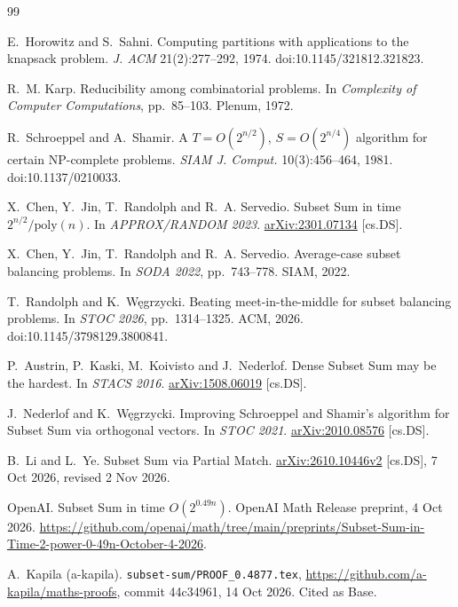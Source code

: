 \documentclass[11pt]{article}
\theoremstyle{plain}
\begin{document}
\begin{thebibliography}{99}

E.~Horowitz and S.~Sahni. Computing partitions with applications to the knapsack problem. \emph{J. ACM} 21(2):277--292, 1974. doi:10.1145/321812.321823.

R.~M. Karp. Reducibility among combinatorial problems. In \emph{Complexity of Computer Computations}, pp.~85--103. Plenum, 1972.

R.~Schroeppel and A.~Shamir. A $T = O(2^{n/2})$, $S = O(2^{n/4})$ algorithm for certain NP-complete problems. \emph{SIAM J. Comput.} 10(3):456--464, 1981. doi:10.1137/0210033.

X.~Chen, Y.~Jin, T.~Randolph and R.~A. Servedio. Subset Sum in time $2^{n/2}/\mathrm{poly}(n)$. In \emph{APPROX/RANDOM 2023}. \href{https://arxiv.org/abs/2301.07134}{arXiv:2301.07134} [cs.DS].

X.~Chen, Y.~Jin, T.~Randolph and R.~A. Servedio. Average-case subset balancing problems. In \emph{SODA 2022}, pp.~743--778. SIAM, 2022.

T.~Randolph and K.~W\k{e}grzycki. Beating meet-in-the-middle for subset balancing problems. In \emph{STOC 2026}, pp.~1314--1325. ACM, 2026. doi:10.1145/3798129.3800841.

P.~Austrin, P.~Kaski, M.~Koivisto and J.~Nederlof. Dense Subset Sum may be the hardest. In \emph{STACS 2016}. \href{https://arxiv.org/abs/1508.06019}{arXiv:1508.06019} [cs.DS].

J.~Nederlof and K.~W\k{e}grzycki. Improving Schroeppel and Shamir's algorithm for Subset Sum via orthogonal vectors. In \emph{STOC 2021}. \href{https://arxiv.org/abs/2010.08576}{arXiv:2010.08576} [cs.DS].

B.~Li and L.~Ye. Subset Sum via Partial Match. \href{https://arxiv.org/abs/2610.10446v2}{arXiv:2610.10446v2} [cs.DS], 7 Oct 2026, revised 2 Nov 2026.

OpenAI. Subset Sum in time $O(2^{0.49n})$. OpenAI Math Release preprint, 4 Oct 2026. \url{https://github.com/openai/math/tree/main/preprints/Subset-Sum-in-Time-2-power-0-49n-October-4-2026}.

A.~Kapila (a-kapila). \texttt{subset-sum/PROOF\_0.4877.tex}, \url{https://github.com/a-kapila/maths-proofs}, commit 44c34961, 14 Oct 2026. Cited as Base.


\end{thebibliography}
\end{document}
